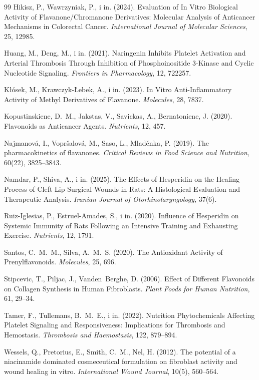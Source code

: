 \documentclass[12pt,a4paper]{article}
\begin{document}
\begin{thebibliography}{99}
Hikisz, P., Wawrzyniak, P., i in. (2024). Evaluation of In Vitro Biological Activity of Flavanone/Chromanone Derivatives: Molecular Analysis of Anticancer Mechanisms in Colorectal Cancer. \textit{International Journal of Molecular Sciences}, 25, 12985.

Huang, M., Deng, M., i in. (2021). Naringenin Inhibits Platelet Activation and Arterial Thrombosis Through Inhibition of Phosphoinositide 3-Kinase and Cyclic Nucleotide Signaling. \textit{Frontiers in Pharmacology}, 12, 722257.

Kłósek, M., Krawczyk-Łebek, A., i in. (2023). In Vitro Anti-Inflammatory Activity of Methyl Derivatives of Flavanone. \textit{Molecules}, 28, 7837.

Kopustinskiene, D.~M., Jakstas, V., Savickas, A., Bernatoniene, J. (2020). Flavonoids as Anticancer Agents. \textit{Nutrients}, 12, 457.

Najmanová, I., Vopršalová, M., Saso, L., Mladěnka, P. (2019). The pharmacokinetics of flavanones. \textit{Critical Reviews in Food Science and Nutrition}, 60(22), 3825--3843.

Namdar, P., Shiva, A., i in. (2025). The Effects of Hesperidin on the Healing Process of Cleft Lip Surgical Wounds in Rats: A Histological Evaluation and Therapeutic Analysis. \textit{Iranian Journal of Otorhinolaryngology}, 37(6).

Ruiz-Iglesias, P., Estruel-Amades, S., i in. (2020). Influence of Hesperidin on Systemic Immunity of Rats Following an Intensive Training and Exhausting Exercise. \textit{Nutrients}, 12, 1791.

Santos, C.~M.~M., Silva, A.~M.~S. (2020). The Antioxidant Activity of Prenylflavonoids. \textit{Molecules}, 25, 696.

Stipcevic, T., Piljac, J., Vanden~Berghe, D. (2006). Effect of Different Flavonoids on Collagen Synthesis in Human Fibroblasts. \textit{Plant Foods for Human Nutrition}, 61, 29--34.

Tamer, F., Tullemans, B.~M.~E., i in. (2022). Nutrition Phytochemicals Affecting Platelet Signaling and Responsiveness: Implications for Thrombosis and Hemostasis. \textit{Thrombosis and Haemostasis}, 122, 879--894.

Wessels, Q., Pretorius, E., Smith, C.~M., Nel, H. (2012). The potential of a niacinamide dominated cosmeceutical formulation on fibroblast activity and wound healing in vitro. \textit{International Wound Journal}, 10(5), 560--564.


\end{thebibliography}
\end{document}
